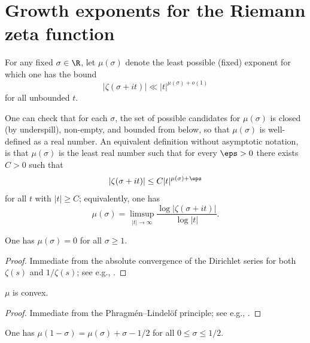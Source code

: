\chapter{Growth exponents for the Riemann zeta function}\label{zeta-growth-chapter}

\begin{definition}\label{zeta-grow-def}
For any fixed $\sigma \in \R$, let $\mu(\sigma)$ denote the least possible (fixed) exponent for which one has the bound
    $$ |\zeta(\sigma+it)| \ll |t|^{\mu(\sigma)+o(1)}$$
    for all unbounded $t$.
\end{definition}

One can check that for each $\sigma$, the set of possible candidates for $\mu(\sigma)$ is closed (by underspill), non-empty, and bounded from below, so that $\mu(\sigma)$ is well-defined as a real number.  An equivalent definition without asymptotic notation, is that $\mu(\sigma)$ is the least real number such that for every $\eps>0$ there exists $C>0$ such that
$$ |\zeta(\sigma+it)| \leq C |t|^{\mu(\sigma)+\eps}$$
for all $t$ with $|t| \geq C$; equivalently, one has
$$ \mu(\sigma) = \limsup_{|t| \to \infty} \frac{\log |\zeta(\sigma+it)|}{\log|t|}.$$


\begin{lemma}\label{zeta-grow-triv}
    One has $\mu(\sigma)=0$ for all $\sigma \geq 1$.
\end{lemma}


\begin{proof}  Immediate from the absolute convergence of the Dirichlet series for both $\zeta(s)$ and $1/\zeta(s)$; see e.g., \cite[Theorem 1.9]{ivic}.
\end{proof}

\begin{lemma}[Convexity]\label{zeta-convex}
$\mu$ is convex.
\end{lemma}


\begin{proof} Immediate from the Phragm\'en--Lindel\"of principle; see e.g., \cite[\S A.8]{ivic}.
\end{proof}

\begin{lemma}\label{zeta-functional}
    One has $\mu(1-\sigma) = \mu(\sigma) + \sigma - 1/2$ for all $0 \leq \sigma \leq 1/2$.
\end{lemma}

